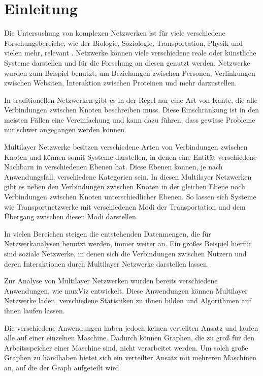 \chapter{Einleitung}


Die Untersuchung von komplexen Netzwerken ist für viele verschiedene Forschungsbereiche, wie der Biologie, Soziologie, Transportation, Physik und vielen mehr, relevant \cite{multiLayerMath}. 
Netzwerke können viele verschiedene reale oder künstliche Systeme darstellen und für die Forschung an diesen genutzt werden. Netzwerke wurden zum Beispiel benutzt, um Beziehungen zwischen Personen, Verlinkungen zwischen Websiten, Interaktion zwischen Proteinen und mehr darzustellen.

In traditionellen Netzwerken gibt es in der Regel nur eine Art von Kante, die alle Verbindungen zwischen Knoten beschreiben muss.
Diese Einschränkung ist in den meisten Fällen eine Vereinfachung und kann dazu führen, dass gewisse Probleme nur schwer angegangen werden können. 

Multilayer Netzwerke besitzen verschiedene Arten von Verbindungen zwischen Knoten und können somit Systeme darstellen, in denen eine Entität verschiedene Nachbarn in verschiedenen Ebenen hat.
Diese Ebenen können, je nach Anwendungsfall, verschiedene Kategorien sein. In diesen Multilayer Netzwerken gibt es neben den Verbindungen zwischen Knoten in der gleichen Ebene noch Verbindungen zwischen Knoten unterschiedlicher Ebenen.
So lassen sich Systeme wie Transportnetzwerke mit verschiedenen Modi der Transportation und dem Übergang zwischen diesen Modi darstellen.

In vielen Bereichen steigen die entstehenden Datenmengen, die für Netzwerkanalysen benutzt werden, immer weiter an. Ein großes Beispiel hierfür sind soziale Netzwerke, in denen sich die Verbindungen zwischen Nutzern und deren Interaktionen durch Multilayer Netzwerke darstellen lassen.


Zur Analyse von Multilayer Netzwerken wurden bereits verschiedene Anwendungen, wie muxViz \cite{De_Domenico_2014} entwickelt. Diese Anwendungen können Multilayer Netzwerke laden, verschiedene Statistiken zu ihnen bilden und Algorithmen auf ihnen laufen lassen.

Die verschiedene Anwendungen haben jedoch keinen verteilten Ansatz und laufen alle auf einer einzelnen Maschine. Dadurch können Graphen, die zu groß für den Arbeitsspeicher einer Maschine sind, nicht verarbeitet werden. 
Um solch große Graphen zu handhaben bietet sich ein verteilter Ansatz mit mehreren Maschinen an, auf die der Graph aufgeteilt wird.



